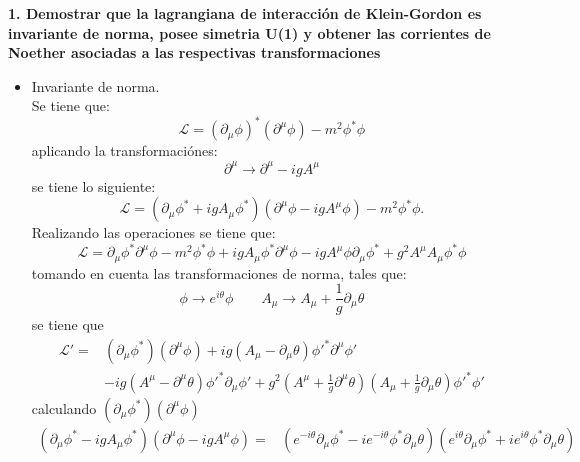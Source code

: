 \textbf{1. Demostrar que la lagrangiana de interacción de Klein-Gordon es invariante de norma, posee simetria U(1) y obtener
las corrientes de Noether asociadas a las respectivas transformaciones}
\begin{itemize}
    \item Invariante de norma.\\
    Se tiene que:
    \begin{equation*}
        \mathcal{L}= \left(\partial_\mu \phi \right)^* \left(\partial^\mu \phi\right) - m^2\phi^*\phi
    \end{equation*}
    aplicando la transformaciónes:
    \begin{equation*}
        \partial^\mu \rightarrow \partial^\mu-igA^\mu 
    \end{equation*}
    se tiene lo siguiente:
    \begin{equation*}
        \mathcal{L}= \left(\partial_\mu\phi^*+igA_\mu  \phi^*\right)
        \left(\partial^\mu \phi-igA^\mu \phi \right)-m^2 \phi^* \phi .
    \end{equation*}
    Realizando las operaciones se tiene que:
    \begin{equation*}
        {\mathcal{L}}= \partial_\mu \phi^* \partial^\mu \phi -m^2 \phi^* \phi +ig A_\mu \phi^* \partial^\mu \phi -ig A^\mu \phi \partial_\mu \phi^* + g^2 A^\mu A_\mu \phi^* \phi
    \end{equation*}
    tomando en cuenta las transformaciones de norma, tales que:
    \begin{equation*}
        \phi \rightarrow e^{i\theta} \phi \qquad A_\mu \rightarrow A_\mu+ \frac{1}{g}\partial_\mu \theta
    \end{equation*}
    se tiene que
    \begin{align*}
        {\mathcal{L}}'=&\left(\partial_\mu\phi^*\right)
        \left(\partial^\mu \phi\right)+ig \left(A_\mu- \partial_\mu \theta\right) {\phi}'^* \partial^\mu {\phi}'\\ &-ig \left(A^\mu- \partial^\mu \theta\right) {\phi}'^* \partial_\mu {\phi}' + g^2 \left(A^\mu+ \frac{1}{g}\partial^\mu \theta\right) \left(A_\mu+ \frac{1}{g}\partial_\mu \theta\right) {\phi}'^* {\phi}'
    \end{align*}
    calculando $\left(\partial_\mu\phi^*\right)
    \left(\partial^\mu \phi\right)$
    \begin{align*}
        \left(\partial_\mu\phi^*-igA_\mu  \phi^*\right)\left(\partial^\mu \phi-igA^\mu \phi \right) =& \left(e^{-i\theta}\partial_\mu \phi^* - ie^{-i\theta}\phi^* \partial_\mu \theta\right) \left(e^{i\theta}\partial_\mu \phi^* + ie^{i\theta}\phi^* \partial_\mu \theta\right)\\

\end{align*}
\end{itemize}
